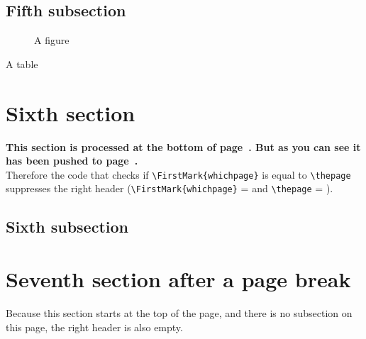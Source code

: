\documentclass{article}
\newcounter{thispage}
\begin{document}
\lipsum[1-7]

\subsection{Fifth subsection}

\lipsum[8-16]

\begin{figure}[p]
  \centering
  \vspace{0.4\textheight}
  \caption{A figure}
\end{figure}

\begin{table}[p]
  \centering
  \vspace{0.5\textheight}
  \caption{A table}
\end{table}

\section{Sixth section}
\label{sec:push}

{\bfseries This section is processed at the bottom of page~\thethispage. But as you can see it has been pushed to page~\pageref{sec:push}.}\\
Therefore the code that checks if \verb|\FirstMark{whichpage}| is equal to \verb|\thepage| suppresses the right header
(\verb|\FirstMark{whichpage}| = \thethispage{} and  \verb|\thepage| = \pageref{sec:push}).

\medskip

\lipsum[1-6]

\subsection{Sixth subsection}

\lipsum[7]

\newpage
\section{Seventh section after a page break}
\label{sec:newpage}

Because this section starts at the top of the page, and there is no subsection on this page, the right header is also empty.

\medskip

\lipsum[8-10]
\end{document}
